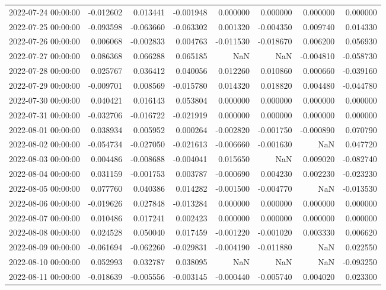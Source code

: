\begin{tabular}{lrrrrrrr}
2022-07-24 00:00:00 & -0.012602 & 0.013441 & -0.001948 & 0.000000 & 0.000000 & 0.000000 & 0.000000 \\
2022-07-25 00:00:00 & -0.093598 & -0.063660 & -0.063302 & 0.001320 & -0.004350 & 0.009740 & 0.014330 \\
2022-07-26 00:00:00 & 0.006068 & -0.002833 & 0.004763 & -0.011530 & -0.018670 & 0.006200 & 0.056930 \\
2022-07-27 00:00:00 & 0.086368 & 0.066288 & 0.065185 & NaN & NaN & -0.004810 & -0.058730 \\
2022-07-28 00:00:00 & 0.025767 & 0.036412 & 0.040056 & 0.012260 & 0.010860 & 0.000660 & -0.039160 \\
2022-07-29 00:00:00 & -0.009701 & 0.008569 & -0.015780 & 0.014320 & 0.018820 & 0.004480 & -0.044780 \\
2022-07-30 00:00:00 & 0.040421 & 0.016143 & 0.053804 & 0.000000 & 0.000000 & 0.000000 & 0.000000 \\
2022-07-31 00:00:00 & -0.032706 & -0.016722 & -0.021919 & 0.000000 & 0.000000 & 0.000000 & 0.000000 \\
2022-08-01 00:00:00 & 0.038934 & 0.005952 & 0.000264 & -0.002820 & -0.001750 & -0.000890 & 0.070790 \\
2022-08-02 00:00:00 & -0.054734 & -0.027050 & -0.021613 & -0.006660 & -0.001630 & NaN & 0.047720 \\
2022-08-03 00:00:00 & 0.004486 & -0.008688 & -0.004041 & 0.015650 & NaN & 0.009020 & -0.082740 \\
2022-08-04 00:00:00 & 0.031159 & -0.001753 & 0.003787 & -0.000690 & 0.004230 & 0.002230 & -0.023230 \\
2022-08-05 00:00:00 & 0.077760 & 0.040386 & 0.014282 & -0.001500 & -0.004770 & NaN & -0.013530 \\
2022-08-06 00:00:00 & -0.019626 & 0.027848 & -0.013284 & 0.000000 & 0.000000 & 0.000000 & 0.000000 \\
2022-08-07 00:00:00 & 0.010486 & 0.017241 & 0.002423 & 0.000000 & 0.000000 & 0.000000 & 0.000000 \\
2022-08-08 00:00:00 & 0.024528 & 0.050040 & 0.017459 & -0.001220 & -0.001020 & 0.003330 & 0.006620 \\
2022-08-09 00:00:00 & -0.061694 & -0.062260 & -0.029831 & -0.004190 & -0.011880 & NaN & 0.022550 \\
2022-08-10 00:00:00 & 0.052993 & 0.032787 & 0.038095 & NaN & NaN & NaN & -0.093250 \\
2022-08-11 00:00:00 & -0.018639 & -0.005556 & -0.003145 & -0.000440 & -0.005740 & 0.004020 & 0.023300 \\

\end{tabular}
